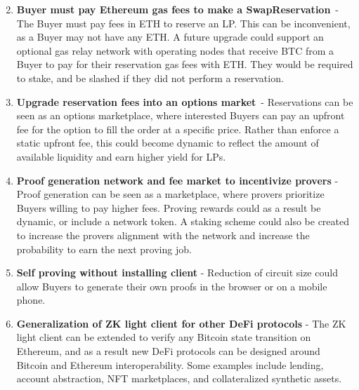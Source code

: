 \documentclass[
]{article}
\providecommand{\tightlist}{%
  \setlength{\itemsep}{0pt}\setlength{\parskip}{0pt}}
\begin{document}
{{{}

\begin{enumerate}
\setcounter{enumi}{1}
\tightlist
\item
  \textbf{Buyer must pay Ethereum gas fees to make a SwapReservation}{~- The
  Buyer must pay fees in ETH to reserve an LP. This can be inconvenient,
  as a Buyer may not have any ETH. A future upgrade could support an
  optional gas relay network with operating nodes that receive BTC from
  a Buyer to pay for their reservation gas fees with ETH. They would be
  required to stake, and be slashed if they did not perform a
  reservation.}
\end{enumerate}

{}

\begin{enumerate}
\setcounter{enumi}{2}
\tightlist
\item
  \textbf{Upgrade reservation fees into an options market}{~- Reservations can
  be seen as an options marketplace, where interested Buyers can pay an
  upfront fee for the option to fill the order at a specific price.
  Rather than enforce a static upfront fee, this could become dynamic to
  reflect the amount of available liquidity and earn higher yield for
  LPs.}
\end{enumerate}

{}

\begin{enumerate}
\setcounter{enumi}{3}
\tightlist
\item
  \textbf{Proof generation network and fee market to incentivize provers }{- Proof generation can be seen as a marketplace, where provers
  prioritize Buyers willing to pay higher fees. Proving rewards could as
  a result be dynamic, or include a network token. A staking scheme
  could also be created to increase the provers alignment with the
  network and increase the probability to earn the next proving job.}
\end{enumerate}

{}

\begin{enumerate}
\setcounter{enumi}{4}
\tightlist
\item
  \textbf{Self proving without installing client }{- Reduction of circuit size
  could allow Buyers to generate their own proofs in the browser or on a
  mobile phone.}
\end{enumerate}

{}

\begin{enumerate}
\setcounter{enumi}{5}
\tightlist
\item
  \textbf{Generalization of ZK light client for other DeFi protocols }{- The ZK
  light client can be extended to verify any Bitcoin state transition on Ethereum, and as a result new DeFi protocols can be designed around
  Bitcoin and Ethereum interoperability. Some examples include lending,
  account abstraction, NFT marketplaces, and collateralized synthetic
  assets.}
\end{enumerate}

}}
\end{document}
